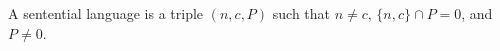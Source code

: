 A sentential language is a triple $(n, c, P)$ such that $n \neq c$, $\{n, c\} \cap P = 0$, and $P \neq 0$.